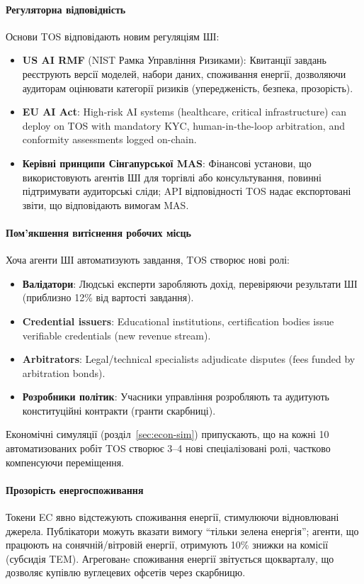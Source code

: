 \documentclass[11pt]{article}
\begin{document}
\paragraph{Регуляторна відповідність} Основи TOS відповідають новим регуляціям ШІ:
\begin{itemize}[noitemsep]
  \item \textbf{US AI RMF} (NIST Рамка Управління Ризиками): Квитанції завдань реєструють версії моделей, набори даних, споживання енергії, дозволяючи аудиторам оцінювати категорії ризиків (упередженість, безпека, прозорість).
  \item \textbf{EU AI Act}: High-risk AI systems (healthcare, critical infrastructure) can deploy on TOS with mandatory KYC, human-in-the-loop arbitration, and conformity assessments logged on-chain.
  \item \textbf{Керівні принципи Сінгапурської MAS}: Фінансові установи, що використовують агентів ШІ для торгівлі або консультування, повинні підтримувати аудиторські сліди; API відповідності TOS надає експортовані звіти, що відповідають вимогам MAS.
\end{itemize}

\paragraph{Пом'якшення витіснення робочих місць} Хоча агенти ШІ автоматизують завдання, TOS створює нові ролі:
\begin{itemize}[noitemsep]
  \item \textbf{Валідатори}: Людські експерти заробляють дохід, перевіряючи результати ШІ (приблизно 12\% від вартості завдання).
  \item \textbf{Credential issuers}: Educational institutions, certification bodies issue verifiable credentials (new revenue stream).
  \item \textbf{Arbitrators}: Legal/technical specialists adjudicate disputes (fees funded by arbitration bonds).
  \item \textbf{Розробники політик}: Учасники управління розробляють та аудитують конституційні контракти (гранти скарбниці).
\end{itemize}
Економічні симуляції (розділ~\ref{sec:econ-sim}) припускають, що на кожні 10 автоматизованих робіт TOS створює 3--4 нові спеціалізовані ролі, частково компенсуючи переміщення.

\paragraph{Прозорість енергоспоживання} Токени EC явно відстежують споживання енергії, стимулюючи відновлювані джерела. Публікатори можуть вказати вимогу ``тільки зелена енергія''; агенти, що працюють на сонячній/вітровій енергії, отримують 10\% знижки на комісії (субсидія TEM). Агрегованe споживання енергії звітується щокварталу, що дозволяє купівлю вуглецевих офсетів через скарбницю.
\end{document}
